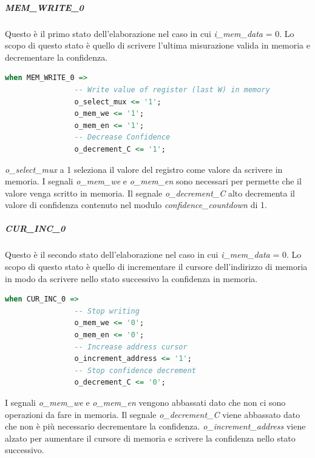\documentclass[12pt,a4paper]{scrartcl}
\begin{document}
                \subparagraph{MEM\_WRITE\_0} Questo è il primo stato dell'elaborazione nel caso in cui \textit{i\_mem\_data} = 0.
                    \newline Lo scopo di questo stato è quello di scrivere l'ultima misurazione valida in memoria e decrementare la confidenza.
                 \begin{lstlisting}[language=VHDL]
            when MEM_WRITE_0 =>
                -- Write value of register (last W) in memory
                o_select_mux <= '1';
                o_mem_we <= '1';
                o_mem_en <= '1';
                -- Decrease Confidence
                o_decrement_C <= '1';
                 \end{lstlisting} 
                 \textit{o\_select\_mux} a 1 seleziona il valore del registro come valore da scrivere in memoria. I segnali \textit{o\_mem\_we} e \textit{o\_mem\_en} sono necessari per permette che il valore venga scritto in memoria.
                 \newline Il segnale \textit{o\_decrement\_C} alto decrementa il valore di confidenza contenuto nel modulo \textit{confidence\_countdown} di 1.

                 \subparagraph{CUR\_INC\_0} Questo è il secondo stato dell'elaborazione nel caso in cui \textit{i\_mem\_data} = 0.
                    \newline Lo scopo di questo stato è quello di incrementare il cursore dell'indirizzo di memoria in modo da scrivere nello stato successivo la confidenza in memoria.
                 \begin{lstlisting}[language=VHDL]
            when CUR_INC_0 =>
                -- Stop writing
                o_mem_we <= '0';
                o_mem_en <= '0';
                -- Increase address cursor
                o_increment_address <= '1';
                -- Stop confidence decrement
                o_decrement_C <= '0';
                 \end{lstlisting} 
                 I segnali \textit{o\_mem\_we} e \textit{o\_mem\_en} vengono abbassati dato che non ci sono operazioni da fare in memoria.
                 \newline Il segnale \textit{o\_decrement\_C} viene abbassato dato che non è più necessario decrementare la confidenza.
                 \newline \textit{o\_increment\_address} viene alzato per aumentare il cursore di memoria e scrivere la confidenza nello stato successivo.
                 
\end{document}
